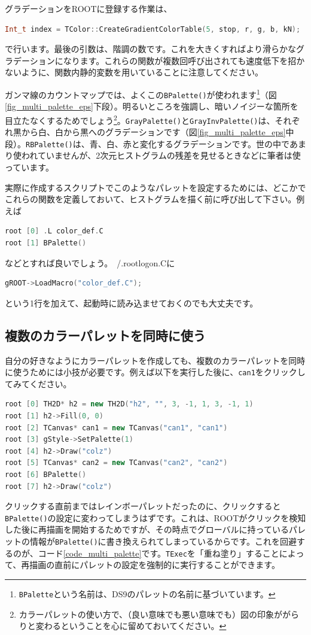 グラデーションをROOTに登録する作業は、
\begin{lstlisting}[language=c++]
  Int_t index = TColor::CreateGradientColorTable(5, stop, r, g, b, kN);
\end{lstlisting}
で行います。最後の引数は、階調の数です。これを大きくすればより滑らかなグラデーションになります。これらの関数が複数回呼び出されても速度低下を招かないように、関数内静的変数を用いていることに注意してください。

ガンマ線のカウントマップでは、よくこの\texttt{BPalette()}が使われます\footnote{\texttt{BPalette}という名前は、DS9のパレットの名前に基づいています。}（図\ref{fig_multi_palette_eps}下段）。明るいところを強調し、暗いノイジーな箇所を目立たなくするためでしょう\footnote{カラーパレットの使い方で、（良い意味でも悪い意味でも）図の印象ががらりと変わるということを心に留めておいてください。}。\texttt{GrayPalette()}と\texttt{GrayInvPalette()}は、それぞれ黒から白、白から黒へのグラデーションです（図\ref{fig_multi_palette_eps}中段）。\texttt{RBPalette()}は、青、白、赤と変化するグラデーションです。世の中であまり使われていませんが、2次元ヒストグラムの残差を見せるときなどに筆者は使っています。

実際に作成するスクリプトでこのようなパレットを設定するためには、どこかでこれらの関数を定義しておいて、ヒストグラムを描く前に呼び出して下さい。例えば
\begin{lstlisting}[language=C++]
root [0] .L color_def.C
root [1] BPalette()
\end{lstlisting}
などとすれば良いでしょう。~/.rootlogon.Cに
\begin{lstlisting}[language=C++]
gROOT->LoadMacro("color_def.C");
\end{lstlisting}
という1行を加えて、起動時に読み込ませておくのでも大丈夫です。

\subsection{複数のカラーパレットを同時に使う}

自分の好きなようにカラーパレットを作成しても、複数のカラーパレットを同時に使うためには小技が必要です。例えば以下を実行した後に、\texttt{can1}をクリックしてみてください。
\begin{lstlisting}[language=C++]
root [0] TH2D* h2 = new TH2D("h2", "", 3, -1, 1, 3, -1, 1)
root [1] h2->Fill(0, 0)
root [2] TCanvas* can1 = new TCanvas("can1", "can1")
root [3] gStyle->SetPalette(1)
root [4] h2->Draw("colz")
root [5] TCanvas* can2 = new TCanvas("can2", "can2")
root [6] BPalette()
root [7] h2->Draw("colz")
\end{lstlisting}
クリックする直前まではレインボーパレットだったのに、クリックすると\texttt{BPalette()}の設定に変わってしまうはずです。これは、ROOTがクリックを検知した後に再描画を開始するためですが、その時点でグローバルに持っているパレットの情報が\texttt{BPalette()}に書き換えられてしまっているからです。これを回避するのが、コード\ref{code_multi_palette}です。\texttt{TExec}を「重ね塗り」することによって、再描画の直前にパレットの設定を強制的に実行することができます。

